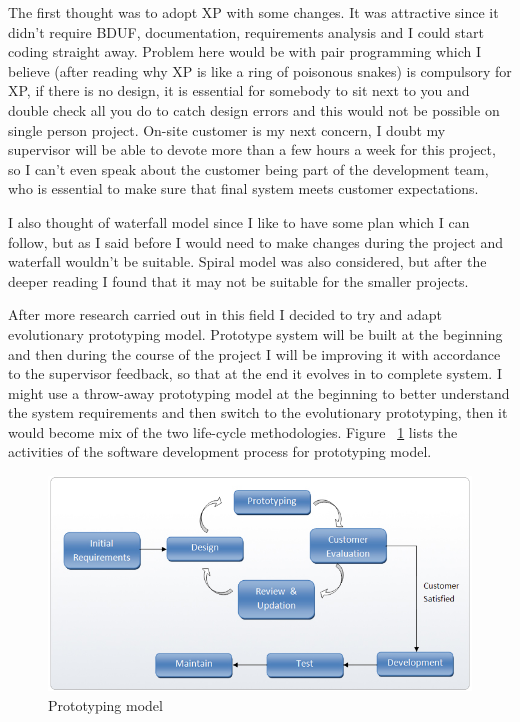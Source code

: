 \documentclass[]{report}
\begin{document}
The first thought was to adopt XP with some changes. It was attractive since it didn't require BDUF, documentation, requirements analysis and I could start coding straight away. Problem here would be with pair programming which I believe (after reading why XP is like a ring of poisonous snakes) is compulsory for XP, if there is no design, it is essential for somebody to sit next to you and double check all you do to catch design errors and this would not be possible on single person project. On-site customer is my next concern, I doubt my supervisor will be able to devote more than a few hours a week for this project, so I can't even speak about the customer being part of the development team, who is essential to make sure that final system meets customer expectations.

I also thought of waterfall model since I like to have some plan which I can follow, but as I said before I would need to make changes during the project and waterfall wouldn't be suitable. Spiral model was also considered, but after the deeper reading I found that it may not be suitable for the smaller projects.

After more research carried out in this field I decided to try and adapt evolutionary prototyping model. Prototype system will be built at the beginning and then during the course of the project I will be improving it with accordance to the supervisor feedback, so that at the end it evolves in to complete system. I might use a throw-away prototyping model at the beginning to better understand the system requirements and then switch to the evolutionary prototyping, then it would become mix of the two life-cycle methodologies. Figure ~\ref{fig:Evolutionary_Prototyping} lists the activities of the software development process for prototyping model. 

\begin{figure}[H]
\centering
\centerline{\includegraphics[scale=0.55]{./prototype_methodology}}
\caption{Prototyping model \cite{Evolutionary_Prototyping}}
\label{fig:Evolutionary_Prototyping}
\end{figure}
\end{document}
